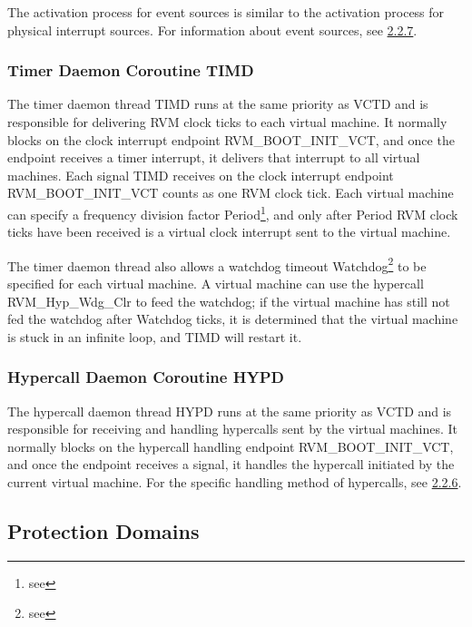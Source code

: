 The activation process for event sources is similar to the activation process for physical interrupt sources. For information about event sources, see \protect\hyperref[subsec:2-2-7]{2.2.7}.

\subsubsection{Timer Daemon Coroutine TIMD}\label{subsubsec:2-1-2-4}

The timer daemon thread TIMD runs at the same priority as VCTD and is responsible for delivering RVM clock ticks to each virtual machine. It normally blocks on the clock interrupt endpoint RVM\_BOOT\_INIT\_VCT, and once the endpoint receives a timer interrupt, it delivers that interrupt to all virtual machines. Each signal TIMD receives on the clock interrupt endpoint RVM\_BOOT\_INIT\_VCT counts as one RVM clock tick. Each virtual machine can specify a frequency division factor Period\footnote{see }, and only after Period RVM clock ticks have been received is a virtual clock interrupt sent to the virtual machine.

The timer daemon thread also allows a watchdog timeout Watchdog\footnote{see } to be specified for each virtual machine. A virtual machine can use the hypercall RVM\_Hyp\_Wdg\_Clr to feed the watchdog; if the virtual machine has still not fed the watchdog after Watchdog ticks, it is determined that the virtual machine is stuck in an infinite loop, and TIMD will restart it.

\subsubsection{Hypercall Daemon Coroutine HYPD}\label{subsubsec:2-1-2-5}

The hypercall daemon thread HYPD runs at the same priority as VCTD and is responsible for receiving and handling hypercalls sent by the virtual machines. It normally blocks on the hypercall handling endpoint RVM\_BOOT\_INIT\_VCT, and once the endpoint receives a signal, it handles the hypercall initiated by the current virtual machine. For the specific handling method of hypercalls, see \protect\hyperref[subsec:2-2-6]{2.2.6}.

\subsection{Protection Domains}\label{subsec:2-1-3}

